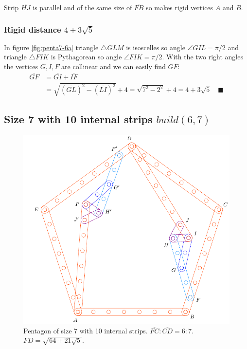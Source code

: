 \documentclass[11pt]{article}
\begin{document}
Strip $\overline{HJ}$ is parallel and of the same size of $\overline{FB}$ so makes rigid vertices $A$ and $B$.

\subsubsection{Rigid distance $4 + 3\sqrt5$}

In figure \ref{fig:penta7-6a} triangle $\triangle{GLM}$ is isoscelles so angle $\angle{GIL} = \pi / 2$ and triangle $\triangle{FIK}$ is Pythagorean so angle $\angle{FIK} = \pi / 2$. With the two right angles the vertices $G,I,F$ are collinear and we can easily find $\overline{GF}$:
\begin{align}
\overline{GF} &= \overline{GI} + \overline{IF} \nonumber\\
 &= \sqrt{(\overline{GL})^2 - (\overline{LI})^2} + 4 
 = \sqrt{7^2 - 2^2} + 4 = 4 + 3\sqrt{5} \quad \blacksquare
\end{align}


\subsection{Size 7 with 10 internal strips $build(6,7)$}

\begin{figure}[H]
\centering
\includegraphics[scale=0.7]{7/penta7-10a}
\caption{Pentagon of size 7 with 10 internal strips. $\overline{FC}:\overline{CD} = 6:7$. $\overline{FD} = \sqrt{64 + 21\sqrt5}$.}
\label{fig:penta7-10a}
\end{figure}
\end{document}
